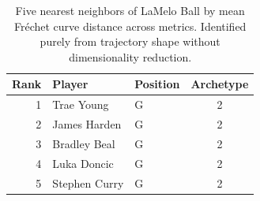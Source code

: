 \begin{table}[htbp]
  \centering\small
  \begin{tabular}{rllc}
    \toprule
    Rank & Player & Position & Archetype \\
    \midrule
    1 & Trae Young & G & 2 \\
    2 & James Harden & G & 2 \\
    3 & Bradley Beal & G & 2 \\
    4 & Luka Doncic & G & 2 \\
    5 & Stephen Curry & G & 2 \\
    \bottomrule
  \end{tabular}
  \caption{Five nearest neighbors of LaMelo Ball by mean Fr\'{e}chet curve distance across metrics. Identified purely from trajectory shape without dimensionality reduction.}
  \label{tab:LaMelo_Ball_frechet_curve_neighbors}
\end{table}

